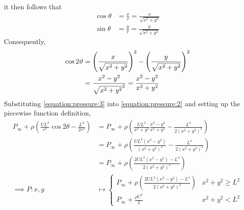 it then follows that
\begin{align*}
    \cos\theta&=\frac{x}{r}=\frac{x}{\sqrt{x^2+y^2}}\\
    \sin\theta&=\frac{y}{r}=\frac{y}{\sqrt{x^2+y^2}}
\end{align*}
Consequently,
\begin{align}
    \notag\cos2\theta&=\left(\frac{x}{\sqrt{x^2+y^2}}\right)^2-\left(\frac{y}{\sqrt{x^2+y^2}}\right)^2\\
    \label{equation:pressure:3}&=\frac{x^2-y^2}{\sqrt{x^2+y^2}^2}=\frac{x^2-y^2}{x^2+y^2}
\end{align}
Substituting \eqref{equation:pressure:3} into \eqref{equation:pressure:2} and setting up the piecewise function definition,
\begin{align*}
    P_\infty+\rho\left(\frac{UL^2}{r^2}\cos2\theta-\frac{L^4}{2r^4}\right)&=P_\infty+\rho\left(\frac{UL^2}{x^2+y^2}\frac{x^2-y^2}{x^2+y^2}-\frac{L^4}{2\left(x^2+y^2\right)^2}\right)\\
    &=P_\infty+\rho\left(\frac{UL^2\left(x^2-y^2\right)}{\left(x^2+y^2\right)^2}-\frac{L^4}{2\left(x^2+y^2\right)^2}\right)\\
    &=P_\infty+\rho\left(\frac{2UL^2\left(x^2-y^2\right)-L^4}{2\left(x^2+y^2\right)^2}\right)\\
    \implies P:x,y&\mapsto\left\{\begin{matrix}
        P_\infty+\rho\left(\frac{2UL^2\left(x^2-y^2\right)-L^4}{2\left(x^2+y^2\right)^2}\right) & x^2+y^2\geq L^2\\
        P_\infty+\frac{\rho U^2}{2} & x^2+y^2<L^2
    \end{matrix}\right.
\end{align*}